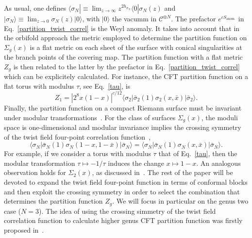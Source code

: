 \documentclass[a4paper,11pt]{article}
\begin{document}
As usual, one defines $\langle \sigma_N |\equiv\lim_{z\rightarrow\infty}z^{2h_{\sigma_{N}}}\langle 0|\sigma_N(z)$ and $|\sigma_{N}\rangle\equiv\lim_{z\rightarrow 0}\sigma_{N}(z)|0\rangle$, with $|0\rangle$ the vacumm in $\mathcal{C}^{\otimes N}$.
The prefactor $e^{cS_{\text{anom.}}}$ in Eq.~\eqref{partition_twist_correl} is the Weyl anomaly. It takes into account that in the orbifold approach the metric employed to determine the partition function on $\Sigma_g(x)$ is a flat metric on each sheet of the surface with conical singularities at the branch points of the covering map. The partition function with a flat metric $Z_g$ is then related to the latter by  the prefactor in Eq.~\eqref{partition_twist_correl} which can be explicitely calculated.  For instance, the CFT partition function on a flat torus 
with modulus $\tau$, see Eq.~\eqref{tau}, is~\cite{Lunin}
\begin{equation}\label{partition_torus_twist}
 Z_1=|2^8 x(1-x)|^{c/12}\langle \sigma_2|\bar{\sigma}_2(1)\sigma_2(x, \bar{x})|\bar{\sigma}_2\rangle.
\end{equation}
Finally, the partition function on a compact Riemann surface must be invariant 
under modular transformations~\cite{CardyMod, Cappelli, Cappelli2}.  For the class of surfaces $\Sigma_g(x)$, the moduli space is one-dimensional and modular invariance implies the crossing
symmetry of the twist field four-point correlation function~\cite{Cardy},
\begin{equation}\label{cross_symmetry}
 \langle \sigma_N|\bar{\sigma}_N(1)\sigma_N(1-x, 1-\bar{x})|\bar{\sigma}_N\rangle=
 \langle \sigma_N|\bar{\sigma}_N(1)\sigma_N(x, \bar{x})|\bar{\sigma}_N\rangle. 
\end{equation}
For example, if we consider a torus with modulus $\tau$ that of Eq.~\eqref{tau},
then the modular transformation $\tau\mapsto-1/\tau$ induces the change
$x\mapsto 1-x$. An analogous observation holds for $\Sigma_{2}(x)$, as discussed in~\cite{Cardy}.
The rest of the paper will be devoted to expand the twist field four-point 
function in terms of conformal blocks and then exploit the crossing symmetry
in order to select the combination that determines the partition function $Z_g$. We will focus in particular on 
the genus two case ($N=3$). The idea of using the crossing simmetry of the twist field correlation function to calculate higher genus CFT partition function was firstly  proposed in~\cite{ZamolodchikovAT}.
\end{document}
